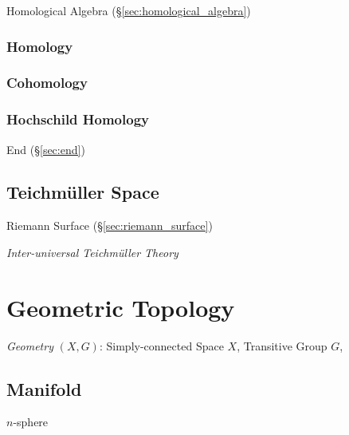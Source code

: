 Homological Algebra (\S\ref{sec:homological_algebra})



\subsubsection{Homology}\label{sec:homology}

\subsubsection{Cohomology}\label{sec:cohomology}

\subsubsection{Hochschild Homology}\label{sec:hochschild_homology}

End (\S\ref{sec:end})



\subsection{Teichm\"uller Space}\label{sec:teichmuller_space}

Riemann Surface (\S\ref{sec:riemann_surface})

\emph{Inter-universal Teichm\"uller Theory} %



\section{Geometric Topology}\label{sec:geometric_topology}

\emph{Geometry} $(X,G)$: Simply-connected Space $X$, Transitive Group $G$,



\subsection{Manifold}\label{sec:manifold}

$n$-sphere

